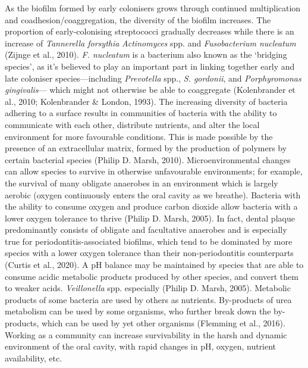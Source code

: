 \documentclass[
  letterpaper,
]{book}
\begin{document}
As the biofilm formed by early colonisers grows through continued
multiplication and coadhesion/coaggregation, the diversity of the
biofilm increases. The proportion of early-colonising streptococci
gradually decreases while there is an increase of \emph{Tannerella
forsythia} \emph{Actinomyces} spp. and \emph{Fusobacterium nucleatum}
(Zijnge et al., 2010). \emph{F. nucleatum} is a bacterium also known as
the `bridging species', as it's believed to play an important part in
linking together early and late coloniser species---including
\emph{Prevotella} spp., \emph{S. gordonii}, and \emph{Porphyromonas
gingivalis}--- which might not otherwise be able to coaggregate
(Kolenbrander et al., 2010; Kolenbrander \& London, 1993). The
increasing diversity of bacteria adhering to a surface results in
communities of bacteria with the ability to communicate with each other,
distribute nutrients, and alter the local environment for more
favourable conditions. This is made possible by the presence of an
extracellular matrix, formed by the production of polymers by certain
bacterial species (Philip D. Marsh, 2010). Microenvironmental changes
can allow species to survive in otherwise unfavourable environments; for
example, the survival of many obligate anaerobes in an environment which
is largely aerobic (oxygen continuously enters the oral cavity as we
breathe). Bacteria with the ability to consume oxygen and produce carbon
dioxide allow bacteria with a lower oxygen tolerance to thrive (Philip
D. Marsh, 2005). In fact, dental plaque predominantly consists of
obligate and facultative anaerobes and is especially true for
periodontitis-associated biofilms, which tend to be dominated by more
species with a lower oxygen tolerance than their non-periodontitis
counterparts (Curtis et al., 2020). A pH balance may be maintained by
species that are able to consume acidic metabolic products produced by
other species, and convert them to weaker acids. \emph{Veillonella} spp.
especially (Philip D. Marsh, 2005). Metabolic products of some bacteria
are used by others as nutrients. By-products of urea metabolism can be
used by some organisms, who further break down the by-products, which
can be used by yet other organisms (Flemming et al., 2016). Working as a
community can increase survivability in the harsh and dynamic
environment of the oral cavity, with rapid changes in pH, oxygen,
nutrient availability, etc.
\end{document}
